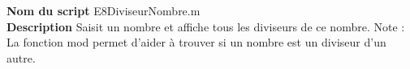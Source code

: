 \textbf{Nom du script}
E8DiviseurNombre.m\\
\textbf{Description}
Saisit un nombre et affiche tous les diviseurs de ce nombre. Note : La fonction mod permet d'aider à trouver si un nombre est un diviseur d'un autre.